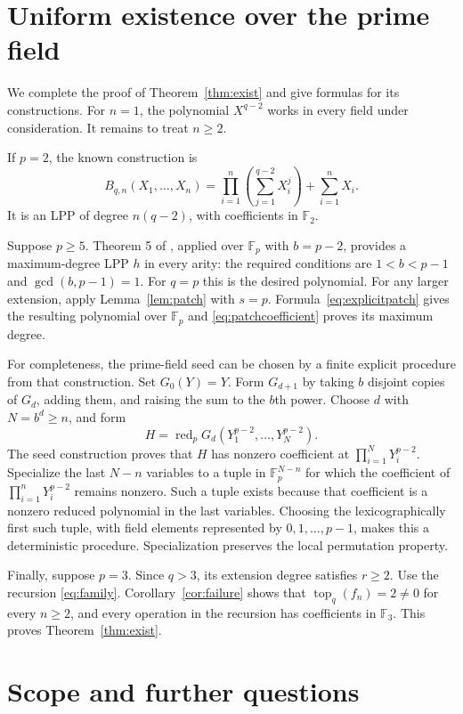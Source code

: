 \documentclass[11pt]{article}
\theoremstyle{remark}\newtheorem{remark}[theorem]{Remark}
\newcommand{\F}{\mathbb F}
\newcommand{\topc}{\operatorname{top}}
\newcommand{\red}{\operatorname{red}}
\begin{document}
\section{Uniform existence over the prime field}

We complete the proof of Theorem~\ref{thm:exist} and give formulas for its
constructions. For $n=1$, the polynomial $X^{q-2}$ works in every field under
consideration. It remains to treat $n\geq2$.

If $p=2$, the known construction \cite[Theorem 4]{GJU-afr} is
\begin{equation}\label{eq:binary}
 B_{q,n}(X_1,\ldots,X_n)
 =\prod_{i=1}^n\left(\sum_{j=1}^{q-2}X_i^j\right)+\sum_{i=1}^nX_i.
\end{equation}
It is an LPP of degree $n(q-2)$, with coefficients in $\F_2$.

Suppose $p\geq5$. Theorem 5 of \cite{GJU-afr}, applied over $\F_p$ with
$b=p-2$, provides a maximum-degree LPP $h$ in every arity: the required
conditions are $1<b<p-1$ and $\gcd(b,p-1)=1$. For $q=p$ this is the desired
polynomial. For any larger extension, apply Lemma~\ref{lem:patch} with
$s=p$. Formula~\eqref{eq:explicitpatch} gives the resulting polynomial over
$\F_p$ and \eqref{eq:patchcoefficient} proves its maximum degree.

For completeness, the prime-field seed can be chosen by a finite explicit
procedure from that construction. Set $G_0(Y)=Y$. Form $G_{d+1}$ by taking
$b$ disjoint copies of $G_d$, adding them, and raising the sum to the $b$th
power. Choose $d$ with $N=b^d\geq n$, and form
\[
 H=\red_p G_d(Y_1^{p-2},\ldots,Y_N^{p-2}).
\]
The seed construction proves that $H$ has nonzero coefficient at
$\prod_{i=1}^N Y_i^{p-2}$. Specialize the last $N-n$ variables to a tuple
in $\F_p^{N-n}$ for which the coefficient of
$\prod_{i=1}^nY_i^{p-2}$ remains nonzero. Such a tuple exists because that
coefficient is a nonzero reduced polynomial in the last variables. Choosing
the lexicographically first such tuple, with field elements represented by
$0,1,\ldots,p-1$, makes this a deterministic procedure. Specialization
preserves the local permutation property.

Finally, suppose $p=3$. Since $q>3$, its extension degree satisfies $r\geq2$.
Use the recursion \eqref{eq:family}. Corollary~\ref{cor:failure} shows that
$\topc_q(f_n)=2\ne0$ for every $n\geq2$, and every operation in the recursion
has coefficients in $\F_3$. This proves Theorem~\ref{thm:exist}.

\section{Scope and further questions}
\end{document}

